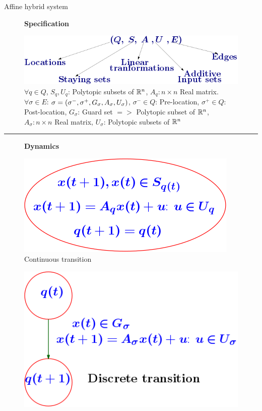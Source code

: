 \begin{frame}{Affine hybrid system}
\begin{figure}
\center
{\bf Specification}
\end{figure}
\begin{figure}
\center
\includegraphics[scale=0.35]{fig/model-spec.png}
\caption*{{\small{\color{darkgray}$\forall q\in Q$, $S_q, U_q$: Polytopic subsets of $\mathbb{R}^n$, $A_q: n\times n$ Real matrix.
$\forall \sigma\in E$: $\sigma = \left(\sigma^-,\sigma^+,G_\sigma,A_\sigma,U_\sigma\right)$, $\sigma^-\in Q$: Pre-location, $\sigma^+\in Q$: Post-location,
$G_\sigma$: Guard set $=>$ Polytopic subset of $\mathbb{R}^n$, $A_\sigma: n\times n$ Real matrix, $U_\sigma$: Polytopic subsets of $\mathbb{R}^n$}}}
\end{figure}
\hrule
\begin{figure}
\center
{\bf Dynamics}
\end{figure}
\begin{minipage}{0.45\textwidth}
\begin{figure}
\centering
\includegraphics[scale=0.35]{fig/cont-transition.png}
\caption*{{\color{black}\hspace{1em} Continuous transition}}
\end{figure}
\end{minipage}
\hspace{1em}\vrule\hspace{1em}
\begin{minipage}{0.45\textwidth}
\begin{figure}
\centering
\includegraphics[scale=0.33]{fig/dis-transition.png}

\end{figure}
\end{minipage}
\end{frame}
